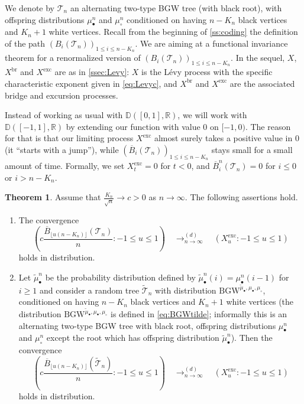 \documentclass[10pt]{amsart}
\theoremstyle{definition}\newtheorem{defi}[theo]{Definition}\newtheorem{rema}[theo]{Remark}\newtheorem{exam}[theo]{Example}\newtheorem{exem}[theo]{Example}\newtheorem{nota}[theo]{Notation}
\newcommand{\R}{\mathbb{R}}
\newcommand{\D}{\mathbb{D}}
\def\tmub{\widetilde{\mu}_{\bullet}}
\def\mub{\mu_{\bullet}}
\def\muc{\mu_{\circ}}
\def\mubn{\mu_{\bullet}^{n}}
\def\mucn{\mu_{\circ}^{n}}
\def\oB{\overline{B}}
\def \Xexc{X^{\mathrm{exc}}}
\def \Xbr{X^{\mathrm{br}}}
\newcommand\BGW{\textrm{BGW}}
\def\Ts{\mathscr{T}}
\newtheorem{theorem}[theo]{Theorem}\newtheorem{lemma}[theo]{Lemma}\newtheorem{proposition}[theo]{Proposition}\newtheorem{corollary}[theo]{Corollary}\newtheorem{remark}[theo]{Remark}
\begin{document}
\enlargethispage*{1em}%
We denote by $ \Ts_{n}$ an alternating two-type BGW tree (with black root), with offspring distributions $\mubn$ and $\mucn$ conditioned on having $n-K_{n}$ black vertices and $K_{n}+1$ white vertices.  Recall from the beginning of \cref{ss:coding} the definition of the path $(B_{i}(\Ts_{n}))_{1 \leq i \leq n-K_{n}}$.
We are aiming at a functional invariance theorem for a renormalized version of $(B_{i}(\Ts_{n}))_{1 \leq i \leq n-K_{n}}$.
In the sequel, $X$, $\Xbr$ and $\Xexc$ are as in \cref{ssec:Levy}:
$X$ is the L\'evy process with the specific characteristic exponent given in \eqref{eq:Levyc},
and $\Xbr$ and $\Xexc$ are the associated bridge and excursion processes.

Instead of working as usual with $\D([0,1],\R)$, we will work with $\D([-1,1],\R)$
by extending our function with value $0$ on $[-1,0)$.
The reason for that is that our limiting process $\Xexc$ almost surely
takes a positive value in $0$ (it ``starts with a jump''),
while $(\oB_{i}(\Ts_{n}))_{1 \leq i \leq n-K_{n}}$ stays small for a small amount of time.
Formally, we set $\Xexc_{t}=0$ for $t<0$,
and $\overline{B}^{n}_{i}(\Ts_n)=0$ for $i \leq 0$ or $i>n-K_{n}$.



\begin{theorem}\label{thm:cvXexc} Assume that $ \tfrac{K_{n}}{\sqrt{n}} \rightarrow c>0$ as $n \rightarrow \infty$. The following assertions hold.
\begin{enumerate}
\item[(i)] The convergence \[  \left(  c \frac{\oB_{\lfloor u (n-K_{n}) \rfloor}(\Ts_{n})}{ n} : -1 \leq u \leq 1\right)  \quad \mathop{\longrightarrow}^{(d)}_{n \rightarrow \infty} \quad (\Xexc_{u}: -1 \leq u \leq 1)\]
holds in distribution.
\item[(ii)]
  Let $\widetilde{\mu}^{n}_{\bullet}$ be the probability distribution defined by
  $\widetilde{\mu}^{n}_{\bullet}(i)=\mubn(i-1)$ for $i \geq 1$
  and consider a random tree $\tilde{\Ts}_{n}$ with distribution ${\BGW}^{\tmub,\mub,\muc}$,
  conditioned on having $n-K_{n}$ black vertices and $K_{n}+1$ white vertices
  (the distribution ${\BGW}^{\tmub,\mub,\muc}$ is defined in \eqref{eq:BGWtilde}; informally this is an alternating two-type BGW tree with black root, offspring distributions $\mubn$ and $\mucn$ except the root which has offspring distribution $\widetilde{\mu}^{n}_{\bullet}$).
  Then the convergence
  \[  \left(  c \frac{\oB_{\lfloor u (n-K_{n}) \rfloor}(\tilde{\Ts}_{n})}{ n} : -1 \leq u \leq 1\right)  \quad \mathop{\longrightarrow}^{(d)}_{n \rightarrow \infty} \quad (\Xexc_{u}: -1 \leq u \leq 1)\]
holds in distribution.
\end{enumerate}
\end{theorem}
\end{document}
